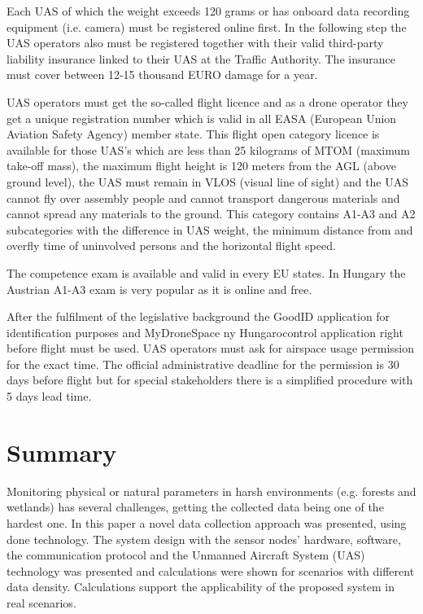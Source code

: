 \documentclass[conference]{IEEEtran}
\begin{document}
Each UAS of which the weight exceeds 120 grams or has onboard data recording
equipment (i.e. camera) must be registered online first. In the following step
the UAS operators also must be registered together with their valid third-party
liability insurance linked to their UAS at the Traffic Authority. The insurance
must cover between 12-15 thousand EURO damage for a year. \cite{legterhu}

UAS operators must get the so-called flight licence and as a drone operator
they get a unique registration number which is valid in all EASA (European
Union Aviation Safety Agency) member state. This flight open category licence
is available for those UAS’s which are less than 25 kilograms of MTOM (maximum
take-off mass), the maximum flight height is 120 meters from the AGL (above
ground level), the UAS must remain in VLOS (visual line of sight) and the UAS
cannot fly over assembly people and cannot transport dangerous materials and
cannot spread any materials to the ground. This category contains A1-A3 and A2
subcategories with the difference in UAS weight, the minimum distance from and
overfly time of uninvolved persons and the horizontal flight speed. \cite{doehu}

The competence exam is available and valid in every EU states. In Hungary the
Austrian A1-A3 exam is very popular as it is online and free.

After the fulfilment of the legislative background the GoodID application for
identification purposes and MyDroneSpace ny Hungarocontrol application right
before flight must be used. UAS operators must ask for airspace usage
permission for the exact time. The official administrative deadline for the
permission is 30 days before flight but for special stakeholders there is a
simplified procedure with 5 days lead time.

\section{Summary}

Monitoring physical or natural parameters in harsh environments (e.g. forests and wetlands) has several
challenges, getting the collected data being one of the hardest one. In this paper a novel data
collection approach was presented, using done technology.
The system design with the sensor nodes' hardware, software,
the communication protocol and the Unmanned Aircraft System (UAS) technology was presented and
calculations were shown for scenarios with different data density.
Calculations support the applicability of the proposed system
in real scenarios.



\end{document}
